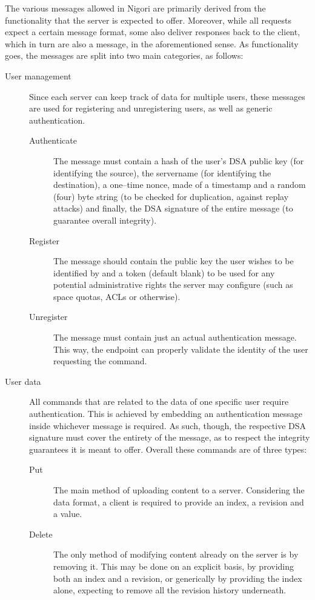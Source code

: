 The various messages allowed in Nigori are primarily derived from the functionality that the server is expected to offer.
Moreover, while all requests expect a certain message format, some also deliver responses back to the client, which in turn are also a message, in the aforementioned sense.
As functionality goes, the messages are split into two main categories, as follows:
\begin{description}
  \item[User management] Since each server can keep track of data for multiple users, these messages are used for registering and unregistering users, as well as generic authentication.
  \begin{description}
    \item[Authenticate] The message must contain a hash of the user's DSA public key (for identifying the source), the servername (for identifying the destination), a one--time nonce, made of a timestamp and a random (four) byte string (to be checked for duplication, against replay attacks) and finally, the DSA signature of the entire message (to guarantee overall integrity).
    \item[Register] The message should contain the public key the user wishes to be identified by and a token (default blank) to be used for any potential administrative rights the server may configure (such as space quotas, ACLs or otherwise).
    \item[Unregister] The message must contain just an actual authentication message.
    This way, the endpoint can properly validate the identity of the user requesting the command.
  \end{description}
  \item[User data] All commands that are related to the data of one specific user require authentication.
  This is achieved by embedding an authentication message inside whichever message is required.
  As such, though, the respective DSA signature must cover the entirety of the message, as to respect the integrity guarantees it is meant to offer.
  Overall these commands are of three types:
  \begin{description}
    \item[Put] The main method of uploading content to a server.
    Considering the data format, a client is required to provide an index, a revision and a value.
    \item[Delete] The only method of modifying content already on the server is by removing it.
    This may be done on an explicit basis, by providing both an index and a revision, or generically by providing the index alone, expecting to remove all the revision history underneath.

\end{description}
\end{description}
